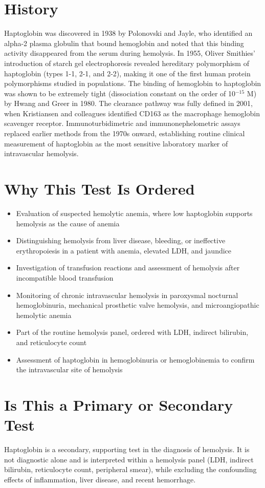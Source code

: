 \section*{History}
Haptoglobin was discovered in 1938 by Polonovski and Jayle, who identified an alpha-2 plasma globulin that bound hemoglobin and noted that this binding activity disappeared from the serum during hemolysis. In 1955, Oliver Smithies' introduction of starch gel electrophoresis revealed hereditary polymorphism of haptoglobin (types 1-1, 2-1, and 2-2), making it one of the first human protein polymorphisms studied in populations. The binding of hemoglobin to haptoglobin was shown to be extremely tight (dissociation constant on the order of 10$^{-15}$ M) by Hwang and Greer in 1980. The clearance pathway was fully defined in 2001, when Kristiansen and colleagues identified CD163 as the macrophage hemoglobin scavenger receptor. Immunoturbidimetric and immunonephelometric assays replaced earlier methods from the 1970s onward, establishing routine clinical measurement of haptoglobin as the most sensitive laboratory marker of intravascular hemolysis.
\section*{Why This Test Is Ordered}
\begin{itemize}
  \item Evaluation of suspected hemolytic anemia, where low haptoglobin supports hemolysis as the cause of anemia
  \item Distinguishing hemolysis from liver disease, bleeding, or ineffective erythropoiesis in a patient with anemia, elevated LDH, and jaundice
  \item Investigation of transfusion reactions and assessment of hemolysis after incompatible blood transfusion
  \item Monitoring of chronic intravascular hemolysis in paroxysmal nocturnal hemoglobinuria, mechanical prosthetic valve hemolysis, and microangiopathic hemolytic anemia
  \item Part of the routine hemolysis panel, ordered with LDH, indirect bilirubin, and reticulocyte count
  \item Assessment of haptoglobin in hemoglobinuria or hemoglobinemia to confirm the intravascular site of hemolysis
\end{itemize}
\section*{Is This a Primary or Secondary Test}
Haptoglobin is a secondary, supporting test in the diagnosis of hemolysis. It is not diagnostic alone and is interpreted within a hemolysis panel (LDH, indirect bilirubin, reticulocyte count, peripheral smear), while excluding the confounding effects of inflammation, liver disease, and recent hemorrhage.
